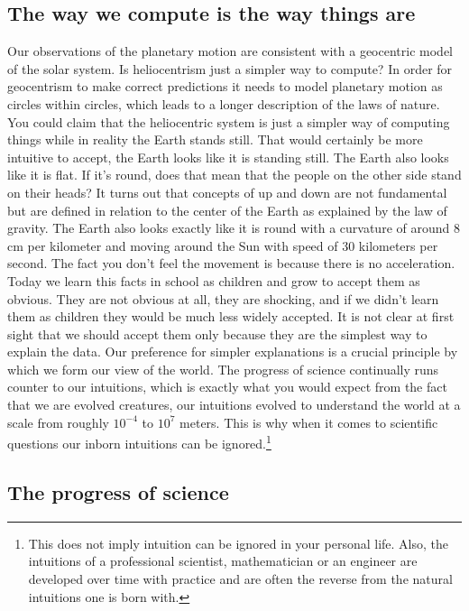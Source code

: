 \documentclass[oneside,hidelinks]{article}
\begin{document}
\newpage

\subsection{The way we compute is the way things are}

Our observations of the planetary motion are consistent with a geocentric model of the solar system.
Is heliocentrism just a simpler way to compute?
In order for geocentrism to make correct predictions it needs to model planetary motion as circles within circles, which leads to a longer description of the laws of nature.
You could claim that the heliocentric system is just a simpler way of computing things while in reality the Earth stands still.
That would certainly be more intuitive to accept, the Earth looks like it is standing still.
The Earth also looks like it is flat.
If it's round, does that mean that the people on the other side stand on their heads?
It turns out that concepts of up and down are not fundamental but are defined in relation to the center of the Earth as explained by the law of gravity.
The Earth also looks exactly like it is round with a curvature of around 8 cm per kilometer and moving around the Sun with speed of 30 kilometers per second.
The fact you don't feel the movement is because there is no acceleration.
Today we learn this facts in school as children and grow to accept them as obvious.
They are not obvious at all, they are shocking, and if we didn't learn them as children they would be much less widely accepted.
It is not clear at first sight that we should accept them only because they are the simplest way to explain the data.
Our preference for simpler explanations is a crucial principle by which we form our view of the world.
The progress of science continually runs counter to our intuitions, which is exactly what you would expect from the fact that we are evolved creatures, our intuitions evolved to understand the world at a scale from roughly $10^{-4}$ to $10^7$ meters.
This is why when it comes to scientific questions our inborn intuitions can be ignored.\footnote{
This does not imply intuition can be ignored in your personal life.
Also, the intuitions of a professional scientist, mathematician or an engineer are developed over time with practice and are often the reverse from the natural intuitions one is born with.
}

\newpage

\subsection{The progress of science}
\end{document}
